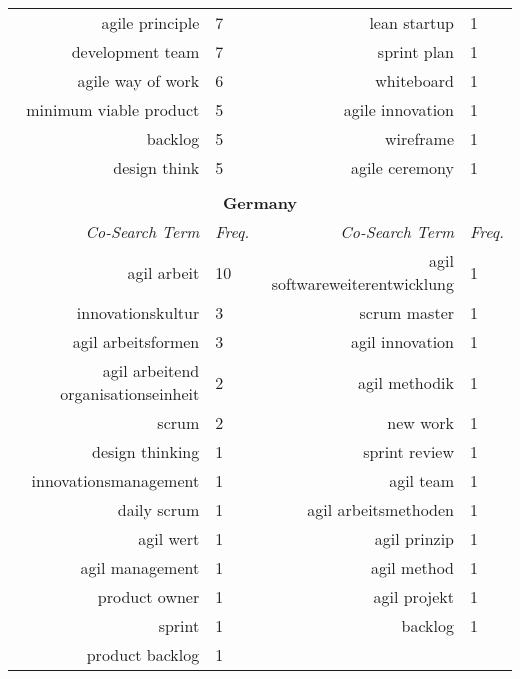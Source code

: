 \begin{spacing}{.65}
\begin{table}[!htbp]
{\begin{tabular}{rlrl}
agile principle        & 7  & lean startup                  & 1 \\
development team       & 7  & sprint plan                   & 1 \\
agile way of work      & 6  & whiteboard                    & 1 \\
minimum viable product & 5  & agile innovation              & 1 \\
backlog                & 5  & wireframe                     & 1 \\
design think           & 5  & agile ceremony                & 1 \\
\\[0.5cm] 



\multicolumn{4}{c}{\textbf{Germany}}                                                                   \\
\textit{Co-Search Term}             & \textit{Freq.} & \textit{Co-Search Term}        & \textit{Freq.} \\ \hline
agil arbeit                         & 10             & agil softwareweiterentwicklung & 1              \\
innovationskultur                   & 3              & scrum master                   & 1              \\
agil arbeitsformen                  & 3              & agil innovation                & 1              \\
agil arbeitend organisationseinheit & 2              & agil methodik                  & 1              \\
scrum                               & 2              & new work                       & 1              \\
design thinking                     & 1              & sprint review                  & 1              \\
innovationsmanagement               & 1              & agil team                      & 1              \\
daily scrum                         & 1              & agil arbeitsmethoden           & 1              \\
agil wert                           & 1              & agil prinzip                   & 1              \\
agil management                     & 1              & agil method                    & 1              \\
product owner                       & 1              & agil projekt                   & 1              \\
sprint                              & 1              & backlog                        & 1              \\
product backlog                     & 1              &                                &               
\end{tabular}%
}
\end{table}
\end{spacing}
\endgroup

